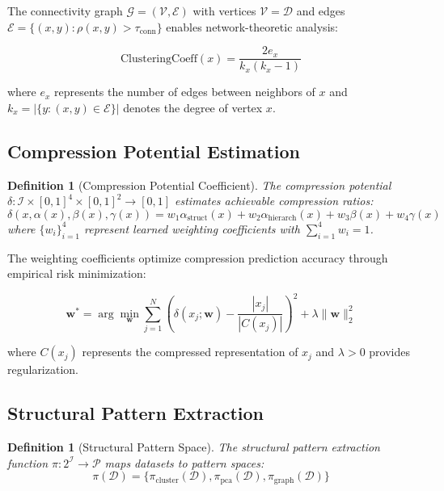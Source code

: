 \documentclass[11pt,a4paper]{article}
\newtheorem{definition}[theorem]{Definition}
\begin{document}
The connectivity graph $\mathcal{G} = (\mathcal{V}, \mathcal{E})$ with vertices $\mathcal{V} = \mathcal{D}$ and edges $\mathcal{E} = \{(x,y) : \rho(x,y) > \tau_{\text{conn}}\}$ enables network-theoretic analysis:

\begin{equation}
\text{ClusteringCoeff}(x) = \frac{2e_x}{k_x(k_x - 1)}
\label{eq:clustering-coefficient}
\end{equation}

where $e_x$ represents the number of edges between neighbors of $x$ and $k_x = |\{y : (x,y) \in \mathcal{E}\}|$ denotes the degree of vertex $x$.

\subsection{Compression Potential Estimation}

\begin{definition}[Compression Potential Coefficient]
The compression potential $\delta: \mathcal{I} \times [0,1]^4 \times [0,1]^2 \to [0,1]$ estimates achievable compression ratios:
\begin{equation}
\delta(x, \alpha(x), \beta(x), \gamma(x)) = w_1 \alpha_{\text{struct}}(x) + w_2 \alpha_{\text{hierarch}}(x) + w_3 \beta(x) + w_4 \gamma(x)
\label{eq:compression-potential}
\end{equation}
where $\{w_i\}_{i=1}^4$ represent learned weighting coefficients with $\sum_{i=1}^4 w_i = 1$.
\end{definition}

The weighting coefficients optimize compression prediction accuracy through empirical risk minimization:

\begin{equation}
\mathbf{w}^* = \arg\min_{\mathbf{w}} \sum_{j=1}^N \left( \delta(x_j; \mathbf{w}) - \frac{|x_j|}{|C(x_j)|} \right)^2 + \lambda \|\mathbf{w}\|_2^2
\label{eq:weight-optimization}
\end{equation}

where $C(x_j)$ represents the compressed representation of $x_j$ and $\lambda > 0$ provides regularization.

\subsection{Structural Pattern Extraction}

\begin{definition}[Structural Pattern Space]
The structural pattern extraction function $\pi: 2^{\mathcal{I}} \to \mathcal{P}$ maps datasets to pattern spaces:
\begin{equation}
\pi(\mathcal{D}) = \{\pi_{\text{cluster}}(\mathcal{D}), \pi_{\text{pca}}(\mathcal{D}), \pi_{\text{graph}}(\mathcal{D})\}
\label{eq:structural-patterns}
\end{equation}
\end{definition}
\end{document}
